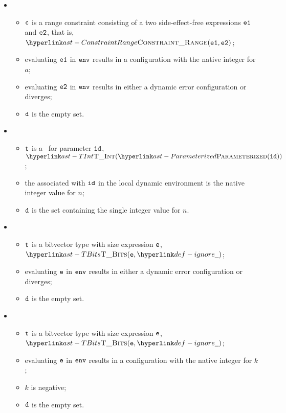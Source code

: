 \begin{itemize}
  \item {}
  \begin{itemize}
    \item $\texttt{c}$ is a range constraint consisting of a two side-effect-free expressions $\texttt{e1}$ and $\texttt{e2}$, that is, $\ConstraintRange(\veone, \vetwo)$;
    \item evaluating $\texttt{e1}$ in $\texttt{env}$ results in a configuration with the native integer for $a$;
    \item evaluating $\texttt{e2}$ in $\texttt{env}$ results in either a dynamic error configuration or diverges;
    \item $\texttt{d}$ is the empty set.
  \end{itemize}

  \item {}
  \begin{itemize}
    \item $\texttt{t}$ is a \parameterizedintegertype\ for parameter $\texttt{id}$, \\ $\TInt(\Parameterized(\id))$;
    \item the \nativevalueterm{} associated with $\texttt{id}$ in the local dynamic environment is the native integer value for $n$;
    \item $\texttt{d}$ is the set containing the single integer value for $n$.
  \end{itemize}

  \item {}
  \begin{itemize}
    \item $\texttt{t}$ is a bitvector type with size expression $\texttt{e}$, $\TBits(\ve, \Ignore)$;
    \item evaluating $\texttt{e}$ in $\texttt{env}$ results in either a dynamic error configuration or diverges;
    \item $\texttt{d}$ is the empty set.
  \end{itemize}

  \item {}
  \begin{itemize}
    \item $\texttt{t}$ is a bitvector type with size expression $\texttt{e}$, $\TBits(\ve, \Ignore)$;
    \item evaluating $\texttt{e}$ in $\texttt{env}$ results in a configuration with the native integer for $k$;
    \item $k$ is negative;
    \item $\texttt{d}$ is the empty set.
  \end{itemize}


\end{itemize}
